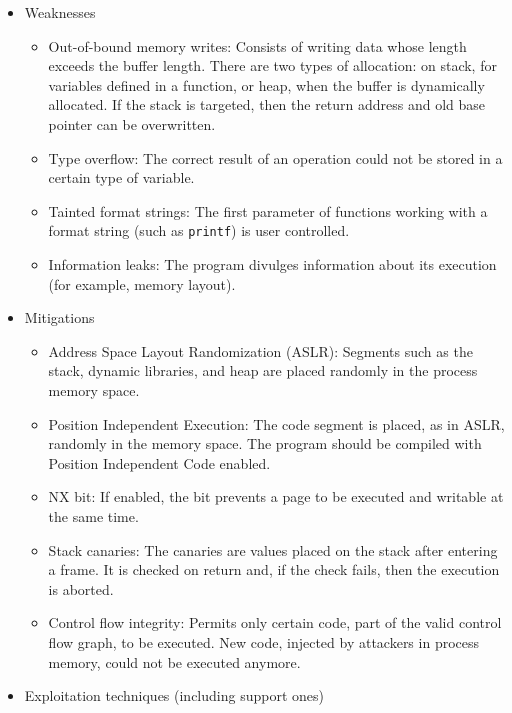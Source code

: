 \documentclass[../main.tex]{subfiles}
\begin{document}
\begin{itemize}
  \tightlist
  \item
        Weaknesses

        \begin{itemize}
          \tightlist
          \item
                Out-of-bound memory writes: Consists of writing data whose length
                exceeds the buffer length. There are two types of allocation: on
                stack, for variables defined in a function, or heap, when the buffer
                is dynamically allocated. If the stack is targeted, then the return
                address and old base pointer can be overwritten.
          \item
                Type overflow: The correct result of an operation could not be
                stored in a certain type of variable.
          \item
                Tainted format strings: The first parameter of functions working
                with a format string (such as \texttt{printf}) is user controlled.
          \item
                Information leaks: The program divulges information about its
                execution (for example, memory layout).
        \end{itemize}
  \item
        Mitigations

        \begin{itemize}
          \tightlist
          \item
                Address Space Layout Randomization (ASLR): Segments such
                as the stack, dynamic libraries, and heap are placed randomly in the
                process memory space.
          \item
                Position Independent Execution: The code segment is placed, as in
                ASLR, randomly in the memory space. The program should be compiled
                with Position Independent Code enabled.
          \item
                NX bit: If enabled, the bit prevents a page to be executed and
                writable at the same time.
          \item
                Stack canaries: The canaries are values placed on the stack after
                entering a frame. It is checked on return and, if the check fails,
                then the execution is aborted.
          \item
                Control flow integrity: Permits only certain code, part of the valid
                control flow graph, to be executed. New code, injected by attackers
                in process memory, could not be executed anymore.
        \end{itemize}
  \item
        Exploitation techniques (including support ones)


\end{itemize}
\end{document}
